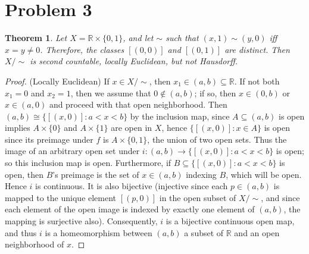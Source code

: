 \documentclass{article}
\newtheorem{theorem}[subsection]{Theorem}
\theoremstyle{definition}
\newcommand{\R}{\mathbb{R}}
\begin{document}
\section{Problem 3}
\begin{theorem}
Let $X=\R \times \{0,1\}$, and let $\sim$ such that $(x,1) \sim (y,0)$ iff 
$x=y \neq 0$. Therefore, the classes $[(0,0)]$ and $[(0,1)]$ are distinct.
Then $X / \sim$ is second countable, locally Euclidean, but not Hausdorff.
\end{theorem}
\begin{proof}
(Locally Euclidean) 
If $x \in X / \sim$, then $x_1 \in (a,b) \subseteq \R$. If
not both $x_1=0$ and $x_2=1$, 
then we assume that $0 \not\in(a,b)$; if so, then
$x\in(0,b)$ or $x\in(a,0)$ and proceed with that open neighborhood. 
Then $(a,b) \cong \{ [(x,0)] : a < x < b \}$ by the inclusion map, 
since $A \subseteq (a,b)$ is open implies $A \times \{0\}$ and
$A \times \{1\}$ are open in $X$, hence 
$\{[(x,0)] : x \in A \}$ is open since its preimage under $f$ is 
$A \times \{0,1\}$, the union of two open sets. Thus the image
of an arbitrary open set under 
$i : (a,b) \to \{[(x,0)] : a < x < b\}$ is open; so this inclusion
map is open. Furthermore, if $B \subseteq \{[(x,0)] : a < x < b\}$ 
is open, then $B$'s preimage is the set of $x \in (a,b)$
indexing $B$, which will be open. Hence $i$ is continuous.
It is also bijective (injective since 
each $p \in (a,b)$ is mapped
to the unique element $[(p,0)]$ in the open subset of $X / \sim$, and
since each element of the open image is indexed by exactly one element
of $(a,b)$, the mapping is surjective also). Consequently, $i$
is a bijective continuous open map, and thus $i$ is a homeomorphism
between $(a,b)$ a subset of $\R$ and an open neighborhood of $x$.


\end{proof}
\end{document}
